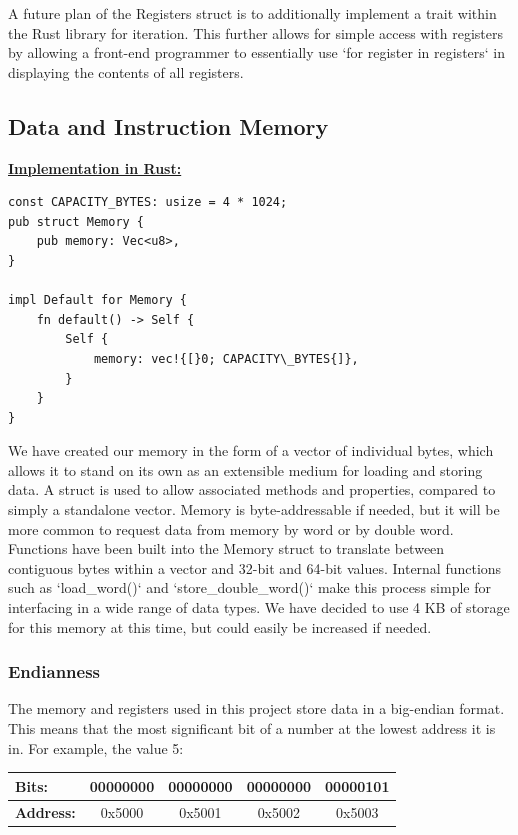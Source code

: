 \documentclass[parskip=half, fontsize=12pt]{scrartcl}
\begin{document}

A future plan of the Registers struct is to additionally implement a
trait within the Rust library for iteration. This further allows for
simple access with registers by allowing a front-end programmer to
essentially use `for register in registers` in displaying the contents
of all registers.

\subsection{Data and Instruction Memory}

\underline{\textbf{Implementation in Rust:}}
\begin{verbatim}
const CAPACITY_BYTES: usize = 4 * 1024;
pub struct Memory {
    pub memory: Vec<u8>,
}

impl Default for Memory {
    fn default() -> Self {
        Self {
            memory: vec!{[}0; CAPACITY\_BYTES{]},
        }
    }
}
\end{verbatim}

We have created our memory in the form of a vector of individual bytes,
which allows it to stand on its own as an extensible medium for loading
and storing data. A struct is used to allow associated methods and
properties, compared to simply a standalone vector. Memory is
byte-addressable if needed, but it will be more common to request data
from memory by word or by double word. Functions have been built into
the Memory struct to translate between contiguous bytes within a vector
and 32-bit and 64-bit values. Internal functions such as `load\_word()`
and `store\_double\_word()` make this process simple for interfacing in
a wide range of data types. We have decided to use 4 KB of storage for
this memory at this time, but could easily be increased if needed.


\subsubsection{Endianness}


The memory and registers used in this project store data in a big-endian
format. This means that the most significant bit of a number at the
lowest address it is in. For example, the value 5:

\begin{tabularx}{\textwidth}{@{}|l|c|c|c|c|@{}}
    \hline
    \textbf{Bits:}    & 00000000 & 00000000 & 00000000 & 00000101 \\\hline
    \textbf{Address:} & 0x5000   & 0x5001   & 0x5002   & 0x5003 \\\hline
\end{tabularx}
\end{document}
